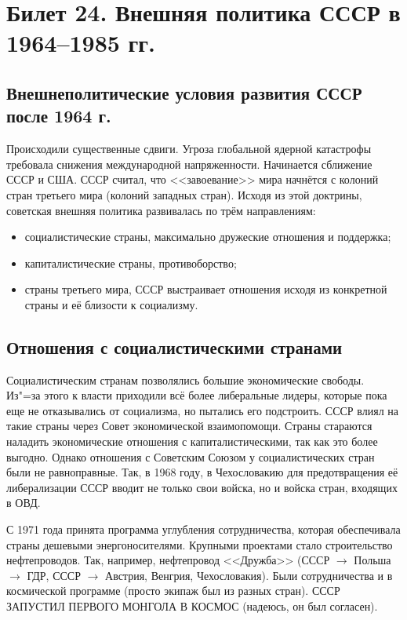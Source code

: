 \section{Билет 24. Внешняя политика СССР в 1964--1985 гг.}
    \subsection{Внешнеполитические условия развития СССР после 1964 г.}
    
    Происходили существенные сдвиги. Угроза глобальной ядерной катастрофы требовала снижения международной напряженности. Начинается сближение СССР и США. СССР считал, что <<завоевание>> мира начнётся с колоний стран третьего мира (колоний западных стран). Исходя из этой доктрины, советская внешняя политика развивалась по трём направлениям:
    
    \begin{itemize}
        \item социалистические страны, максимально дружеские отношения и поддержка;
        \item капиталистические страны, противоборство;
        \item страны третьего мира, СССР выстраивает отношения исходя из конкретной страны и её близости к социализму.
    \end{itemize}

    \subsection{Отношения с социалистическими странами}
    
    Социалистическим странам позволялись большие экономические свободы. Из"=за этого к власти приходили всё более либеральные лидеры, которые пока еще не отказывались от социализма, но пытались его подстроить. СССР влиял на такие страны через Совет экономической взаимопомощи. Страны стараются наладить экономические отношения с капиталистическими, так как это более выгодно. Однако отношения с Советским Союзом у социалистических стран были не равноправные. Так, в 1968 году, в Чехословакию для предотвращения её либерализации СССР вводит не только свои войска, но и войска стран, входящих в ОВД. 
    
    С 1971 года принята программа углубления сотрудничества, которая обеспечивала страны дешевыми энергоносителями. Крупными проектами стало строительство нефтепроводов. Так, например, нефтепровод <<Дружба>> (СССР $\rightarrow$ Польша $\rightarrow$ ГДР, СССР $\rightarrow$ Австрия, Венгрия, Чехословакия). Были сотрудничества и в космической программе (просто экипаж был из разных стран). СССР ЗАПУСТИЛ ПЕРВОГО МОНГОЛА В КОСМОС (надеюсь, он был согласен). %
    
